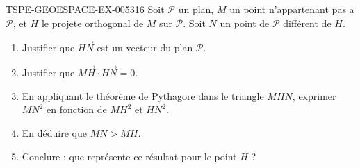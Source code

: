 \begin{exercice}{TSPE-GEOESPACE-EX-005}{3}{16}
Soit $\mathcal{P}$ un plan, $M$ un point n'appartenant pas a $\mathcal{P}$, et $H$ le projete orthogonal de $M$ sur $\mathcal{P}$. Soit $N$ un point de $\mathcal{P}$ différent de $H$.
\begin{enumerate}
  \item Justifier que $\vec{HN}$ est un vecteur du plan $\mathcal{P}$.
  \item Justifier que $\vec{MH}\cdot\vec{HN}=0$.
  \item En appliquant le théorème de Pythagore dans le triangle $MHN$, exprimer $MN^2$ en fonction de $MH^2$ et $HN^2$.
  \item En déduire que $MN>MH$.
  \item Conclure : que représente ce résultat pour le point $H$ ?
\end{enumerate}
\end{exercice}
